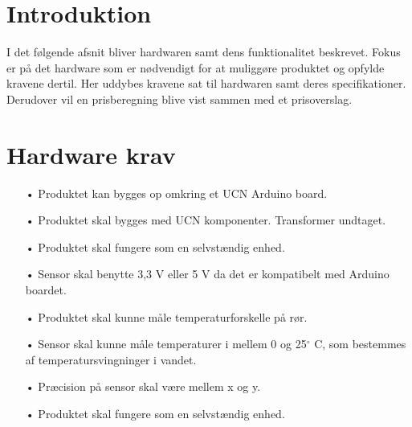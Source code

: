 \section{Introduktion}
I det følgende afsnit bliver hardwaren samt dens funktionalitet beskrevet. Fokus er på det hardware som er nødvendigt for at muliggøre produktet og opfylde kravene dertil. \newline
Her uddybes kravene sat til hardwaren samt deres specifikationer. Derudover vil en prisberegning blive vist sammen med et prisoverslag.

\section{Hardware krav}
\begin{enumerate}
	\item[•]Produktet kan bygges op omkring et UCN Arduino board. 
	\item[•]Produktet skal bygges med UCN komponenter. Transformer undtaget.
	\item[•]Produktet skal fungere som en selvstændig enhed.
	\item[•]Sensor skal benytte 3,3 V eller 5 V da det er kompatibelt med Arduino boardet.
	\item[•]Produktet skal kunne måle temperaturforskelle på rør.
	\item[•]Sensor skal kunne måle temperaturer i mellem 0 og 25$^{\circ}$ C, som bestemmes af temperatursvingninger i vandet.
	\item[•]Præcision på sensor skal være mellem x og y. 
	\item[•]Produktet skal fungere som en selvstændig enhed.
\end{enumerate}	
